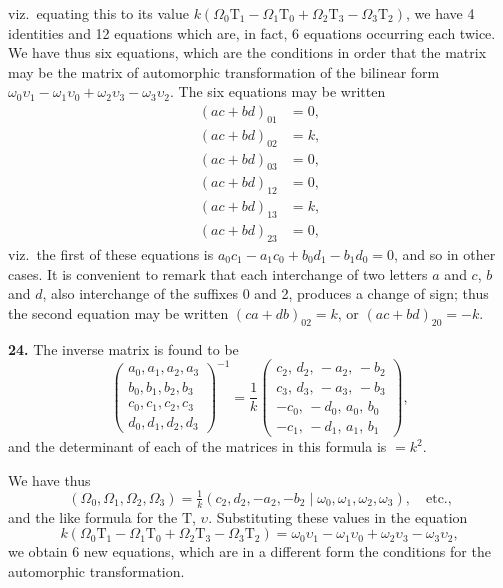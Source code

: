 \documentclass[11pt]{article}
\begin{document}
\medskip
viz.\ equating this to its value $k(\Omega_{0}\mathrm{T}_{1}-\Omega_{1}\mathrm{T}_{0}+\Omega_{2}\mathrm{T}_{3}-\Omega_{3}\mathrm{T}_{2})$, we have 4 identities and 12 equations which are, in fact, 6 equations occurring each twice. We have thus six equations, which are the conditions in order that the matrix may be the matrix of automorphic transformation of the bilinear form $\omega_{0}\upsilon_{1}-\omega_{1}\upsilon_{0}+\omega_{2}\upsilon_{3}-\omega_{3}\upsilon_{2}$. The six equations may be written
\begin{align*}
(ac+bd)_{01} &= 0,\\
(ac+bd)_{02} &= k,\\
(ac+bd)_{03} &= 0,\\
(ac+bd)_{12} &= 0,\\
(ac+bd)_{13} &= k,\\
(ac+bd)_{23} &= 0,
\end{align*}
viz.\ the first of these equations is $a_{0}c_{1}-a_{1}c_{0}+b_{0}d_{1}-b_{1}d_{0}=0$, and so in other cases. It is convenient to remark that each interchange of two letters $a$ and $c$, $b$ and $d$, also interchange of the suffixes 0 and 2, produces a change of sign; thus the second equation may be written $(ca+db)_{02}=k$, or $(ac+bd)_{20}=-k$.

\medskip
\noindent\textbf{24.} The inverse matrix is found to be
\[
\begin{pmatrix}a_{0},a_{1},a_{2},a_{3}\\ b_{0},b_{1},b_{2},b_{3}\\ c_{0},c_{1},c_{2},c_{3}\\ d_{0},d_{1},d_{2},d_{3}\end{pmatrix}^{-1}=\frac{1}{k}\begin{pmatrix}c_{2},\,d_{2},\,-a_{2},\,-b_{2}\\ c_{3},\,d_{3},\,-a_{3},\,-b_{3}\\ -c_{0},\,-d_{0},\,a_{0},\,b_{0}\\ -c_{1},\,-d_{1},\,a_{1},\,b_{1}\end{pmatrix},
\]
and the determinant of each of the matrices in this formula is $=k^{2}$.

We have thus
\[
(\Omega_{0},\Omega_{1},\Omega_{2},\Omega_{3})=\tfrac{1}{k}(c_{2},d_{2},-a_{2},-b_{2}\mid \omega_{0},\omega_{1},\omega_{2},\omega_{3}),\quad\text{etc.,}
\]
and the like formula for the $\mathrm{T}$, $\upsilon$.  Substituting these values in the equation
\[
k(\Omega_{0}\mathrm{T}_{1}-\Omega_{1}\mathrm{T}_{0}+\Omega_{2}\mathrm{T}_{3}-\Omega_{3}\mathrm{T}_{2})=\omega_{0}\upsilon_{1}-\omega_{1}\upsilon_{0}+\omega_{2}\upsilon_{3}-\omega_{3}\upsilon_{2},
\]
we obtain 6 new equations, which are in a different form the conditions for the automorphic transformation.
\end{document}
